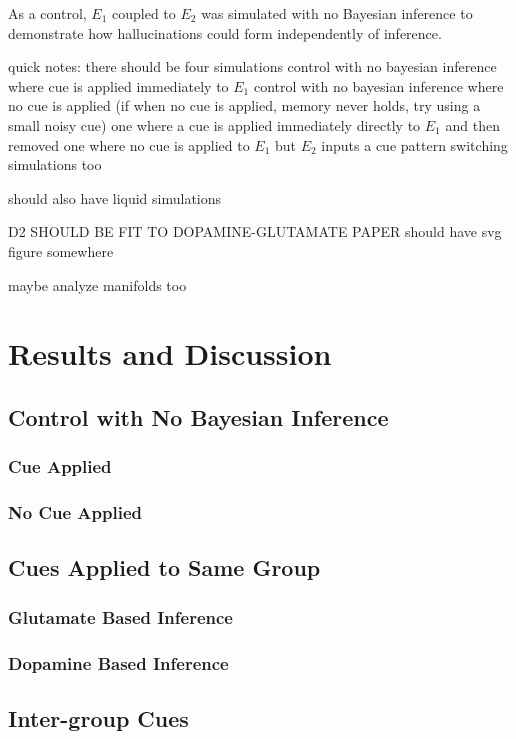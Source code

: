 \documentclass[twocolumn]{article}
\begin{document}
As a control, $E_1$ coupled to $E_2$ was simulated with no Bayesian inference to demonstrate how hallucinations could form independently of inference.

quick notes: 
there should be four simulations
control with no bayesian inference where cue is applied immediately to $E_1$
control with no bayesian inference where no cue is applied
(if when no cue is applied, memory never holds, try using a small noisy cue)
one where a cue is applied immediately directly to $E_1$ and then removed
one where no cue is applied to $E_1$ but $E_2$ inputs a cue
pattern switching simulations too

should also have liquid simulations

D2 SHOULD BE FIT TO DOPAMINE-GLUTAMATE PAPER
should have svg figure somewhere

maybe analyze manifolds too

\section{Results and Discussion}

\subsection{Control with No Bayesian Inference}
\subsubsection{Cue Applied}
\subsubsection{No Cue Applied}

\subsection{Cues Applied to Same Group}
\subsubsection{Glutamate Based Inference}
\subsubsection{Dopamine Based Inference}

\subsection{Inter-group Cues}
\end{document}

